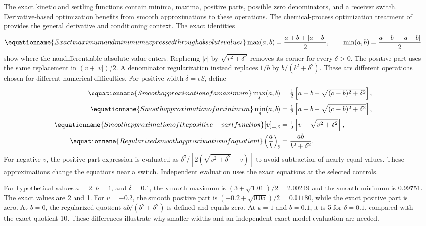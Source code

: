 The exact kinetic and settling functions contain minima, maxima, positive parts, possible zero denominators, and a receiver switch. Derivative-based optimization benefits from smooth approximations to these operations. The chemical-process optimization treatment of \citet{BuzziFerraris2013} provides the general derivative and conditioning context. The exact identities
\begin{equation}
\equationname{Exact maximum and minimum expressed through absolute values}
\max(a,b)=\frac{a+b+|a-b|}{2},\qquad
\min(a,b)=\frac{a+b-|a-b|}{2}
\end{equation}
show where the nondifferentiable absolute value enters. Replacing $|r|$ by $\sqrt{r^2+\delta^2}$ removes its corner for every $\delta>0$. The positive part uses the same replacement in $(v+|v|)/2$. A denominator regularization instead replaces $1/b$ by $b/(b^2+\delta^2)$. These are different operations chosen for different numerical difficulties. For positive width $\delta=\epsilon S$, define
\begin{align}
\equationname{Smooth approximation of a maximum}
\max_\delta(a,b)&=\tfrac12\left[a+b+\sqrt{(a-b)^2+\delta^2}\right],\\
\equationname{Smooth approximation of a minimum}
\min_\delta(a,b)&=\tfrac12\left[a+b-\sqrt{(a-b)^2+\delta^2}\right],\\
\equationname{Smooth approximation of the positive-part function}
[v]_{+,\delta}&=\tfrac12\left[v+\sqrt{v^2+\delta^2}\right],\\
\equationname{Regularized smooth approximation of a quotient}
\left(\frac ab\right)_\delta&=\frac{ab}{b^2+\delta^2}.
\label{eq:plant_smooth_operations}
\end{align}
For negative $v$, the positive-part expression is evaluated as $\delta^2/[2(\sqrt{v^2+\delta^2}-v)]$ to avoid subtraction of nearly equal values. These approximations change the equations near a switch. Independent evaluation uses the exact equations at the selected controls.

For hypothetical values $a=2$, $b=1$, and $\delta=0.1$, the smooth maximum is $(3+\sqrt{1.01})/2=2.00249$ and the smooth minimum is 0.99751. The exact values are 2 and 1. For $v=-0.2$, the smooth positive part is $(-0.2+\sqrt{0.05})/2=0.01180$, while the exact positive part is zero. At $b=0$, the regularized quotient $ab/(b^2+\delta^2)$ is defined and equals zero. At $a=1$ and $b=0.1$, it is 5 for $\delta=0.1$, compared with the exact quotient 10. These differences illustrate why smaller widths and an independent exact-model evaluation are needed.

